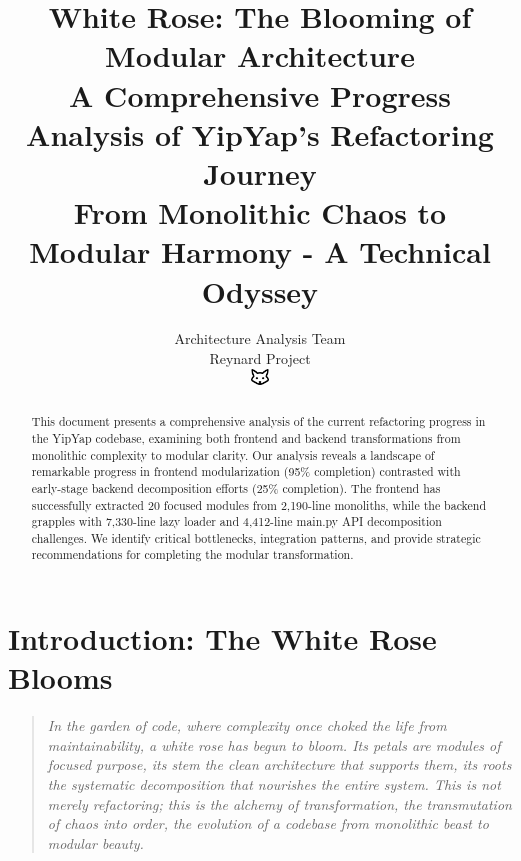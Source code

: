 \documentclass[11pt]{article}
\begin{document}
\title{\textbf{White Rose: The Blooming of Modular Architecture} \\
\Large{A Comprehensive Progress Analysis of YipYap's Refactoring Journey} \\
\large{From Monolithic Chaos to Modular Harmony - A Technical Odyssey}}

\author{Architecture Analysis Team\\
Reynard Project\\
\includegraphics[width=0.5cm]{../../shared-assets/favicon.pdf}}

\maketitle

\begin{abstract}
This document presents a comprehensive analysis of the current refactoring progress in the YipYap codebase, examining both frontend and backend transformations from monolithic complexity to modular clarity. Our analysis reveals a landscape of remarkable progress in frontend modularization (95\% completion) contrasted with early-stage backend decomposition efforts (25\% completion). The frontend has successfully extracted 20 focused modules from 2,190-line monoliths, while the backend grapples with 7,330-line lazy loader and 4,412-line main.py API decomposition challenges. We identify critical bottlenecks, integration patterns, and provide strategic recommendations for completing the modular transformation.
\end{abstract}

\tableofcontents
\newpage

\section{Introduction: The White Rose Blooms}

\begin{quote}
\emph{In the garden of code, where complexity once choked the life from maintainability, a white rose has begun to bloom. Its petals are modules of focused purpose, its stem the clean architecture that supports them, its roots the systematic decomposition that nourishes the entire system. This is not merely refactoring; this is the alchemy of transformation, the transmutation of chaos into order, the evolution of a codebase from monolithic beast to modular beauty.}
\end{quote}
\end{document}
